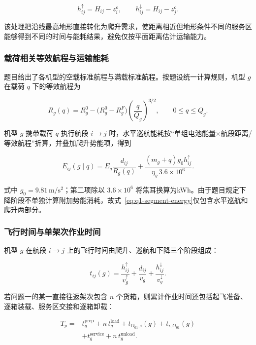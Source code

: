 \documentclass[bwprint,fontset=fandol]{gmcmthesis}
\begin{document}
\begin{equation}
h_{ij}^{\uparrow}=H_{ij}-z_i^o,\qquad
h_{ij}^{\downarrow}=H_{ij}-z_j^o.
\label{eq:q1-vertical-height}
\end{equation}

该处理把沿线最高地形直接转化为爬升需求，使距离相近但地形条件不同的服务区能够得到不同的时间与能耗结果，避免仅按平面距离估计运输能力。

\subsubsection{载荷相关等效航程与运输能耗}
题目给出了各机型的空载标准航程与满载标准航程。按题设统一计算规则，机型 $g$ 在载荷 $q$ 下的等效航程为

\begin{equation}
R_g(q)=R_g^0-\bigl(R_g^0-R_g^F\bigr)
\left(\frac{q}{Q_g}\right)^{3/2},\qquad 0\le q\le Q_g.
\label{eq:q1-range}
\end{equation}

机型 $g$ 携带载荷 $q$ 执行航段 $i\to j$ 时，水平巡航能耗按“单组电池能量$\times$航段距离/等效航程”折算，并叠加爬升势能项，得到

\begin{equation}
E_{ij}(g\mid q)
=E_g\frac{d_{ij}}{R_g(q)}
+\frac{(m_g+q)g_0h_{ij}^{\uparrow}}{\eta_g\,3.6\times10^6}.
\label{eq:q1-segment-energy}
\end{equation}

式中 $g_0=9.81\,\mathrm{m}/\mathrm{s}^2$；第二项除以 $3.6\times10^6$ 将焦耳换算为kWh。由于题目规定下降阶段不单独计算附加势能消耗，故式~\eqref{eq:q1-segment-energy}仅包含水平巡航和爬升两部分。

\subsubsection{飞行时间与单架次作业时间}
机型 $g$ 在航段 $i\to j$ 上的飞行时间由爬升、巡航和下降三个阶段组成：

\begin{equation}
t_{ij}(g)
=\frac{h_{ij}^{\uparrow}}{v_g^{\uparrow}}
+\frac{d_{ij}}{v_g}
+\frac{h_{ij}^{\downarrow}}{v_g^{\downarrow}}.
\label{eq:q1-flight-time}
\end{equation}

若问题一的某一直接往返架次包含 $n$ 个货箱，则累计作业时间还包括起飞准备、逐箱装载、服务区交接和逐箱卸载：

\begin{equation}
\begin{aligned}
T_p={}&t_g^{\mathrm{prep}}+n\,t_g^{\mathrm{load}}
+t_{O_{01},i}(g)+t_{i,O_{01}}(g)\\
&+t_g^{\mathrm{service}}+n\,t_g^{\mathrm{unload}}.
\end{aligned}
\label{eq:q1-operation-time}
\end{equation}
\end{document}
